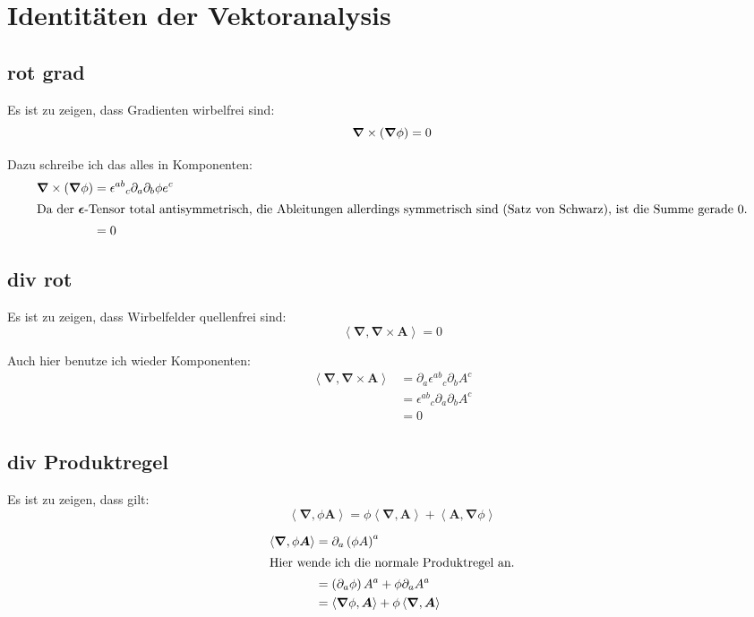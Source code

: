 \documentclass[11pt, ngerman]{article}
\newcommand{\divergence}[1]{\inner{\vnabla}{#1}}
\newcommand{\inner}[2]{\left\langle #1, #2 \right\rangle}
\newcommand{\tens}[1]{\boldsymbol{#1}}
\newcommand{\vnabla}{\vec \nabla}
\renewcommand{\vec}[1]{\boldsymbol{#1}}
\begin{document}

\section{Identitäten der Vektoranalysis}

\subsection{rot grad}

Es ist zu zeigen, dass Gradienten wirbelfrei sind:
\[ \vnabla \times \del{\vnabla \phi} = 0 \]

Dazu schreibe ich das alles in Komponenten:
%
\begin{align*}
	\vnabla \times \del{\vnabla \phi} &=
	\epsilon^{ab}{}_{c} \partial_a \partial_b \phi e^c \\
	\intertext{Da der $\tens \epsilon$-Tensor total antisymmetrisch, die Ableitungen allerdings symmetrisch sind (Satz von Schwarz), ist die Summe gerade 0.}
	&= 0
\end{align*}

\subsection{div rot}

Es ist zu zeigen, dass Wirbelfelder quellenfrei sind:
\[ \divergence{\vnabla \times \vec A} = 0 \]

Auch hier benutze ich wieder Komponenten:
%
\begin{align*}
	\divergence{\vnabla \times \vec A}
	&= \partial_a \epsilon^{ab}{}_{c} \partial_b A^c \\
	&= \epsilon^{ab}{}_{c} \partial_a \partial_b A^c \\
	&= 0
\end{align*}

\subsection{div Produktregel}

Es ist zu zeigen, dass gilt:
\[ \divergence{\phi \vec A} = \phi \divergence{\vec A} + \inner{\vec A}{\vnabla \phi} \]

\begin{align*}
	\divergence{\phi \vec A}
	&= \partial_a \del{\phi A}^a \\
	\intertext{Hier wende ich die normale Produktregel an.}
	&= \del{\partial_a \phi} A^a + \phi \partial_a A^a \\
	&= \inner{\vnabla \phi}{\vec A} + \phi \divergence{\vec A}
\end{align*}
\end{document}
